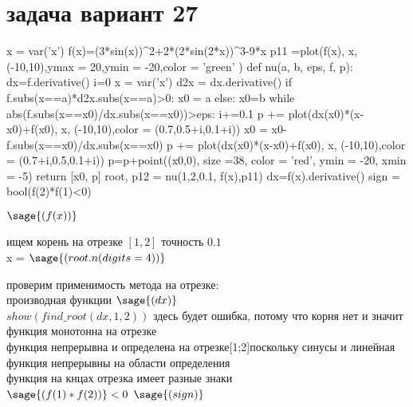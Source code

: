 \section{задача вариант 27}
\begin {sagesilent}
x = var('x')
f(x)=(3*sin(x))^2+2*(2*sin(2*x))^3-9*x
p11 =plot(f(x), x, (-10,10),ymax = 20,ymin = -20,color = 'green' )
def nu(a, b, eps, f, p):
    dx=f.derivative()
    i=0
    x = var('x')
    d2x = dx.derivative()
    if f.subs(x==a)*d2x.subs(x==a)>0:
        x0 = a
    else:
        x0=b
    while abs(f.subs(x==x0)/dx.subs(x==x0))>eps:
        i+=0.1
        p += plot(dx(x0)*(x-x0)+f(x0), x, (-10,10),color = (0.7,0.5+i,0.1+i))
        x0 = x0-f.subs(x==x0)/dx.subs(x==x0)
    p += plot(dx(x0)*(x-x0)+f(x0), x, (-10,10),color = (0.7+i,0.5,0.1+i))
    p=p+point((x0,0), size =38, color = 'red', ymin = -20, xmin = -5)
    return [x0, p]
root, p12 = nu(1,2,0.1, f(x),p11)
dx=f(x).derivative()
sign = bool(f(2)*f(1)<0)
\end {sagesilent}
$\sage{(f(x))}$
\begin{center}
\end{center}
ищем корень на отрезке $[1,2]$ точность $0.1$\\
x = $\sage{(root.n(digits = 4))}$
\begin{center}
\end{center}
проверим применимость метода на отрезке:\\
производная функции $\sage{(dx)}$\\
$show(find\_root(dx,1,2))$ здесь будет ошибка, потому что корня нет и значит функция монотонна на отрезке\\
функция непрерывна и определена на отрезке[1;2]поскольку синусы и линейная функция непрерывны на области определения\\
функция на кнцах отрезка имеет разные знаки\\
$\sage {(f(1)*f(2))}<0$
$\sage {(sign)}$

